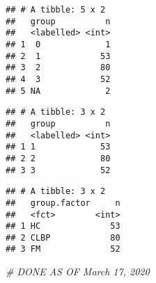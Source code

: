 \documentclass[]{article}
\newenvironment{Shaded}{\begin{snugshade}}{\end{snugshade}}
\newcommand{\KeywordTok}[1]{\textcolor[rgb]{0.13,0.29,0.53}{\textbf{#1}}}
\newcommand{\DataTypeTok}[1]{\textcolor[rgb]{0.13,0.29,0.53}{#1}}
\newcommand{\DecValTok}[1]{\textcolor[rgb]{0.00,0.00,0.81}{#1}}
\newcommand{\StringTok}[1]{\textcolor[rgb]{0.31,0.60,0.02}{#1}}
\newcommand{\CommentTok}[1]{\textcolor[rgb]{0.56,0.35,0.01}{\textit{#1}}}
\newcommand{\OtherTok}[1]{\textcolor[rgb]{0.56,0.35,0.01}{#1}}
\newcommand{\OperatorTok}[1]{\textcolor[rgb]{0.81,0.36,0.00}{\textbf{#1}}}
\newcommand{\NormalTok}[1]{#1}
\begin{document}
\begin{verbatim}
## # A tibble: 5 x 2
##   group          n
##   <labelled> <int>
## 1  0             1
## 2  1            53
## 3  2            80
## 4  3            52
## 5 NA             2
\end{verbatim}

\begin{Shaded}
\end{Shaded}

\begin{verbatim}
## # A tibble: 3 x 2
##   group          n
##   <labelled> <int>
## 1 1             53
## 2 2             80
## 3 3             52
\end{verbatim}

\begin{Shaded}
\end{Shaded}

\begin{verbatim}
## # A tibble: 3 x 2
##   group.factor     n
##   <fct>        <int>
## 1 HC              53
## 2 CLBP            80
## 3 FM              52
\end{verbatim}

\begin{Shaded}
\begin{Highlighting}[]
\CommentTok{#       DONE AS OF March 17, 2020}
\end{Highlighting}
\end{Shaded}
\end{document}
